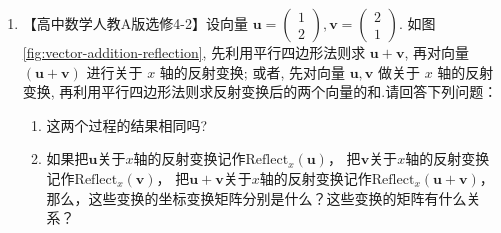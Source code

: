 \documentclass[lang=cn,newtx,10pt,scheme=chinese]{elegantbook}
\begin{document}
\begin{exercise}

  \begin{enumerate}
    \item   【高中数学人教A版选修4-2】设向量 $\boldsymbol{u}=\left(\begin{array}{l}1 \\ 2\end{array}\right), \boldsymbol{v}=\left(\begin{array}{l}2 \\ 1\end{array}\right)$. 
            如图 \ref{fig:vector-addition-reflection}, 先利用平行四边形法则求 $\boldsymbol{u}+\boldsymbol{v}$, 再对向量 $(\boldsymbol{u}+\boldsymbol{v})$ 进行关于 $x$ 轴的反射变换; 
            或者, 先对向量 $\boldsymbol{u}, \boldsymbol{v}$ 做关于 $x$ 轴的反射变换, 
            再利用平行四边形法则求反射变换后的两个向量的和.请回答下列问题：

            \begin{enumerate}
              \item 这两个过程的结果相同吗?
              \item 如果把$\boldsymbol{u}$关于$x$轴的反射变换记作$\text{Reflect}_{x}(\boldsymbol{u})$，
              把$\boldsymbol{v}$关于$x$轴的反射变换记作$\text{Reflect}_{x}(\boldsymbol{v})$，
              把$\boldsymbol{u}+\boldsymbol{v}$关于$x$轴的反射变换记作$\text{Reflect}_{x}(\boldsymbol{u}+\boldsymbol{v})$，
              那么，这些变换的坐标变换矩阵分别是什么？这些变换的矩阵有什么关系？
            \end{enumerate}

            \begin{figure}[!h]
            \centering
\end{figure}
\end{enumerate}
\end{exercise}
\end{document}
